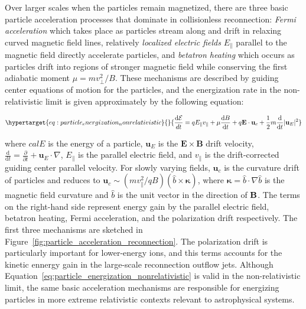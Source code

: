 \documentclass[
  notoc %
]{tufte-book}
\begin{document}
Over larger scales when the particles remain magnetized, there are three
basic particle acceleration processes that dominate in collisionless
reconnection: \emph{Fermi acceleration} which takes place as particles
stream along and drift in relaxing curved magnetic field lines,
relatively \emph{localized electric fields} \(E_\parallel\) parallel to
the magnetic field directly accelerate particles, and \emph{betatron
heating} which occurs as particles drift into regions of stronger
magnetic field while conserving the first adiabatic moment
\(\mu=mv_\perp^2/B\). These mechanisms are described by guiding center
equations of motion for the particles, and the energization rate in the
non-relativistic limit is given approximately by the following equation:

\begin{equation}\protect\hypertarget{eq:particle_energization_nonrelativistic}{}{
\frac{\mathrm{d}{\cal E}}{dt} = qE_\parallel v_\parallel + \mu\frac{\mathrm{d}B}{\mathrm{d}t} + q\mathbf{E}\cdot\mathbf{u}_c + \frac{1}{2}m\frac{\mathrm{d}}{\mathrm{d}t}|\mathbf{u}_E|^2
}\label{eq:particle_energization_nonrelativistic}\end{equation}

where \({cal E}\) is the energy of a particle, \(\mathbf{u}_E\) is the
\(\mathbf{E}\times\mathbf{B}\) drift velocity,
\(\frac{\mathrm{d}}{\mathrm{d}t}=\frac{\partial}{\partial t} + \mathbf{u}_E\cdot\nabla\),
\(E_\parallel\) is the parallel electric field, and \(v_\parallel\) is
the drift-corrected guiding center parallel velocity. For slowly varying
fields, \(\mathbf{u}_c\) is the curvature drift of particles and reduces
to \(\mathbf{u}_c \sim(mv_\parallel^2/qB)(\hat{b}\times\pmb{\kappa})\),
where \(\pmb{\kappa}=\hat{b}\cdot\nabla\hat{b}\) is the magnetic field
curvature and \(\hat{b}\) is the unit vector in the direction of
\({\bf B}\). The terms on the right-hand side represent energy gain by
the parallel electric field, betatron heating, Fermi acceleration, and
the polarization drift respectively. The first three mechanisms are
sketched in Figure~\ref{fig:particle_acceleration_reconnection}. The
polarization drift is particularly important for lower-energy ions, and
this terms accounts for the kinetic ennergy gain in the large-scale
reconnection outflow jets. Although
Equation~\ref{eq:particle_energization_nonrelativistic} is valid in the
non-relativistic limit, the same basic acceleration mechanisms are
responsible for energizing particles in more extreme relativistic
contexts relevant to astrophysical systems.
\end{document}
